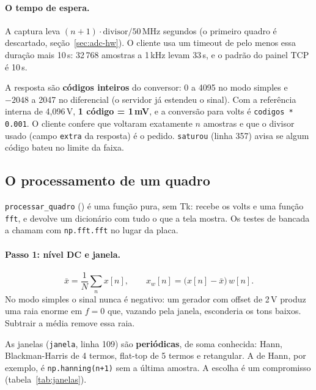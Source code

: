 \documentclass[11pt,a4paper,oneside]{article}
\newcommand{\arq}[1]{{\upshape\ttfamily\detokenize{#1}}}
\begin{document}
\paragraph{O tempo de espera.} A captura leva $(n+1)\cdot
\text{divisor}/50\,\text{MHz}$ segundos (o primeiro quadro é descartado,
seção~\ref{sec:adc-hw}). O cliente usa um timeout de pelo menos essa duração
mais 10\,s: 32\,768 amostras a 1\,kHz levam 33\,s, e o padrão do painel TCP é
10\,s.

A resposta são \textbf{códigos inteiros} do conversor: 0 a 4095 no modo simples
e $-2048$ a 2047 no diferencial (o servidor já estendeu o sinal). Com a
referência interna de 4,096\,V, \textbf{1 código = 1\,mV}, e a conversão para
volts é \texttt{codigos * 0.001}. O cliente confere que voltaram exatamente $n$
amostras e que o divisor usado (campo \texttt{extra} da resposta) é o pedido.
\texttt{saturou} (linha 357) avisa se algum código bateu no limite da faixa.

\subsection{O processamento de um quadro}
\label{sec:quadro}

\texttt{processar\_quadro} (\arq{analisador_window.py:120}) é uma função pura,
sem Tk: recebe os volts e uma função \texttt{fft}, e devolve um dicionário com
tudo o que a tela mostra. Os testes de bancada a chamam com
\texttt{np.fft.fft} no lugar da placa.

\paragraph{Passo 1: nível DC e janela.}
\[
  \bar{x} = \frac{1}{N}\sum_{n} x[n], \qquad
  x_w[n] = \bigl(x[n] - \bar{x}\bigr)\, w[n] .
\]
No modo simples o sinal nunca é negativo: um gerador com offset de 2\,V produz
uma raia enorme em $f=0$ que, vazando pela janela, esconderia os tons baixos.
Subtrair a média remove essa raia.

As janelas (\texttt{janela}, linha 109) são \textbf{periódicas}, de soma
conhecida: Hann, Blackman-Harris de 4 termos, flat-top de 5 termos e
retangular. A de Hann, por exemplo, é \texttt{np.hanning(n+1)} sem a última
amostra. A escolha é um compromisso
(tabela~\ref{tab:janelas}).
\end{document}
